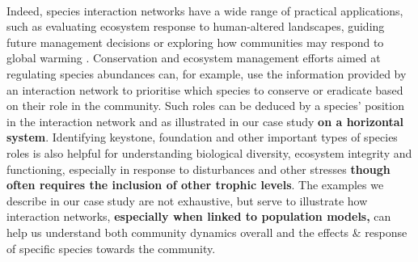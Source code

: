 \documentclass[a4,12pt]{article}
\begin{document}
\begin{refsection}

    \paragraph{}
    Indeed, species interaction networks have a wide range of practical applications, such as evaluating ecosystem response to human-altered landscapes, guiding future management decisions \parencite{Ross2011} or exploring how communities may respond to global warming \parencite{Gorman2019}. Conservation and ecosystem management efforts aimed at regulating species abundances can, for example, use the information provided by an interaction network to prioritise which species to conserve or eradicate based on their role in the community. Such roles can be deduced by a species' position in the interaction network \parencite{Cirtwill2018a} and as illustrated in our case study \textbf{on a horizontal system}. Identifying keystone, foundation and other important types of species roles is also helpful for understanding biological diversity, ecosystem integrity and functioning, especially in response to disturbances and other stresses \parencite{Nyakatya2008, Orwin2016, Losapio2017, Narwani2019} \textbf{though often requires the inclusion of other trophic levels}. The examples we describe in our case study are not exhaustive, but serve to illustrate how interaction networks, \textbf{especially when linked to population models,} can help us understand both community dynamics overall and the effects \& response of specific species towards the community. 


\end{refsection}
\end{document}
